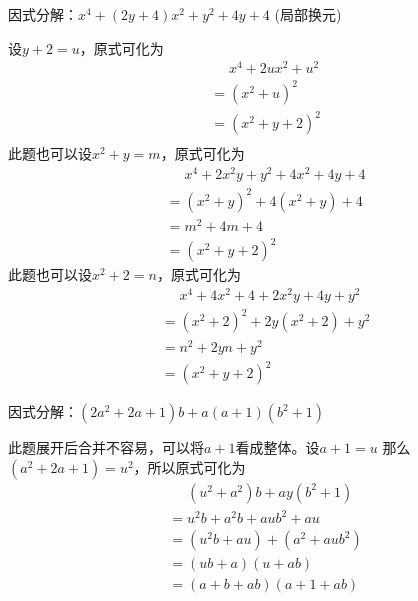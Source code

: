 \documentclass[windows,csize4,answers]{BHCexam}
\begin{document}
\begin{groups}
\begin{questions}[]
        \question[5]因式分解：$x^4+(2y+4)x^2+y^2+4y+4$ (局部换元)
        \begin{solution}{0.5cm}
            \method 设$y+2=u$，原式可化为
            \[
                \begin{aligned}
                     & \phantom{=}x^4+2ux^2+u^2 \\
                     & =(x^2+u)^2               \\
                     & =(x^2+y+2)^2             \\
                \end{aligned}
            \]
            \method 此题也可以设$x^2+y=m$，原式可化为
            \[
                \begin{aligned}
                     & \phantom{=}x^4+2x^2 y+y^2+4x^2+4y+4 \\
                     & =(x^2+y)^2 + 4(x^2+y) +4            \\
                     & =m^2+4m+4                           \\
                     & =(x^2+y+2)^2
                \end{aligned}
            \]
            \method 此题也可以设$x^2+2=n$，原式可化为
            \[
                \begin{aligned}
                     & \phantom{=}x^4+4x^2+4+2x^2 y+4y+y^2 \\
                     & =(x^2+2)^2+2y(x^2+2)+y^2            \\
                     & =n^2+2yn+y^2                        \\
                     & =(x^2+y+2)^2
                \end{aligned}
            \]
        \end{solution}
        \vspace{3.5cm}

        \question[5] 因式分解：$(2a^2+2a+1)b+a(a+1)(b^2+1)$
        \begin{solution}{0.5cm}
            \methodonly 此题展开后合并不容易，可以将$a+1$看成整体。设$a+1=u$
            那么$(a^2+2a+1)=u^2$，所以原式可化为
            \[
                \begin{aligned}
                     & \phantom{=}(u^2+a^2)b+ay(b^2+1) \\
                     & =u^2b+a^2b+aub^2+au             \\
                     & =(u^2b+au)+(a^2+aub^2)          \\
                     & =(ub+a)(u+ab)                   \\
                     & =(a+b+ab)(a+1+ab)
                \end{aligned}
            \]
        \end{solution}


\end{questions}
\end{groups}
\end{document}
